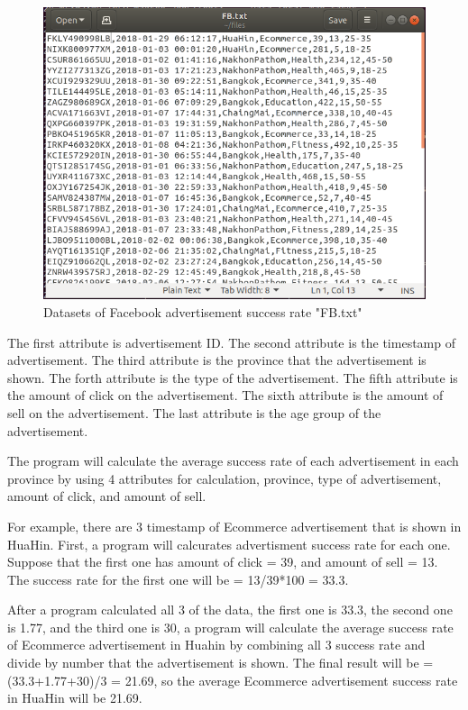 \documentclass[11pt]{article}
\begin{document}
\begin{figure}[h]
\centering
\includegraphics[scale=0.7]{in0}
\caption{Datasets of Facebook advertisement success rate "FB.txt"}
\end{figure}

The first attribute is advertisement ID. The second attribute is the timestamp of advertisement. The third attribute is the province that the advertisement is shown. The forth attribute is the type of the advertisement. The fifth attribute is the amount of click on the advertisement. The sixth attribute is the amount of sell on the advertisement. The last attribute is the age group of the advertisement.

The program will calculate the average success rate of each advertisement in each province by using 4 attributes for calculation, province, type of advertisement, amount of click, and amount of sell. 

For example, there are 3 timestamp of Ecommerce advertisement that is shown in HuaHin. First, a program will calcurates advertisment success rate for each one. Suppose that the first one has amount of click = 39, and amount of sell = 13. The success rate for the first one will be = 13/39*100 = 33.3. 


\newpage
After a program calculated all 3 of the data, the first one is 33.3, the second one is 1.77, and the third one is 30, a program will calculate the average success rate of Ecommerce advertisement in Huahin by combining all 3 success rate and divide by number that the advertisement is shown. The final result will be = (33.3+1.77+30)/3 = 21.69, so the average Ecommerce advertisement success rate in HuaHin will be 21.69. 
\end{document}
